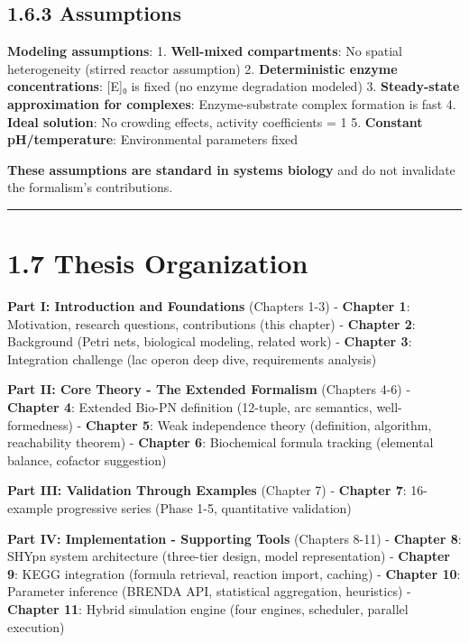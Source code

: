 \hypertarget{assumptions}{%
\subsection{1.6.3 Assumptions}\label{assumptions}}

\textbf{Modeling assumptions}: 1. \textbf{Well-mixed compartments}: No
spatial heterogeneity (stirred reactor assumption) 2.
\textbf{Deterministic enzyme concentrations}: {[}E{]}₀ is fixed (no
enzyme degradation modeled) 3. \textbf{Steady-state approximation for
complexes}: Enzyme-substrate complex formation is fast 4. \textbf{Ideal
solution}: No crowding effects, activity coefficients = 1 5.
\textbf{Constant pH/temperature}: Environmental parameters fixed

\textbf{These assumptions are standard in systems biology} and do not
invalidate the formalism's contributions.

\begin{center}\rule{0.5\linewidth}{0.5pt}\end{center}

\hypertarget{thesis-organization}{%
\section{1.7 Thesis Organization}\label{thesis-organization}}

\textbf{Part I: Introduction and Foundations} (Chapters 1-3) -
\textbf{Chapter 1}: Motivation, research questions, contributions (this
chapter) - \textbf{Chapter 2}: Background (Petri nets, biological
modeling, related work) - \textbf{Chapter 3}: Integration challenge (lac
operon deep dive, requirements analysis)

\textbf{Part II: Core Theory - The Extended Formalism} (Chapters 4-6) -
\textbf{Chapter 4}: Extended Bio-PN definition (12-tuple, arc semantics,
well-formedness) - \textbf{Chapter 5}: Weak independence theory
(definition, algorithm, reachability theorem) - \textbf{Chapter 6}:
Biochemical formula tracking (elemental balance, cofactor suggestion)

\textbf{Part III: Validation Through Examples} (Chapter 7) -
\textbf{Chapter 7}: 16-example progressive series (Phase 1-5,
quantitative validation)

\textbf{Part IV: Implementation - Supporting Tools} (Chapters 8-11) -
\textbf{Chapter 8}: SHYpn system architecture (three-tier design, model
representation) - \textbf{Chapter 9}: KEGG integration (formula
retrieval, reaction import, caching) - \textbf{Chapter 10}: Parameter
inference (BRENDA API, statistical aggregation, heuristics) -
\textbf{Chapter 11}: Hybrid simulation engine (four engines, scheduler,
parallel execution)

